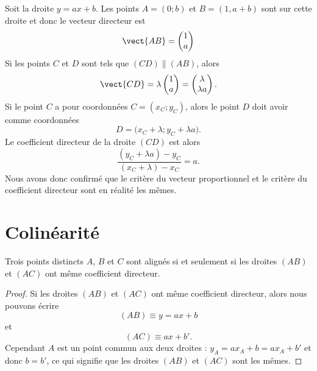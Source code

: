 Soit la droite \( y=ax+b\). Les points \( A=(0;b)\) et \( B=(1,a+b)\) sont sur cette droite et donc le vecteur directeur est
\begin{equation}
    \vect{ AB }=\begin{pmatrix}
        1    \\ 
        a    
    \end{pmatrix}
\end{equation}
Si les points \( C\) et \( D\) sont tels que \( (CD)\parallel (AB)\), alors
\begin{equation}
    \vect{ CD }=\lambda\begin{pmatrix}
        1    \\ 
        a    
    \end{pmatrix}=\begin{pmatrix}
        \lambda    \\ 
            \lambda a
    \end{pmatrix}.
\end{equation}
Si le point \( C\) a pour coordonnées \( C=(x_C;y_C)\), alors le point \( D\) doit avoir comme coordonnées
\begin{equation}
    D=\big( x_C+\lambda;y_C+\lambda a \big).
\end{equation}
Le coefficient directeur de la droite \( (CD)\) est alors
\begin{equation}
    \frac{ (y_C+\lambda a)-y_C }{ (x_C+\lambda)-x_C }=a.
\end{equation}
Nous avons donc confirmé que le critère du vecteur proportionnel et le critère du coefficient directeur sont en réalité les mêmes.

\section{Colinéarité}

\begin{theorem}
    Trois points distincts \( A\), \( B\) et \( C\) sont alignés si et seulement si les droites \( (AB)\) et \( (AC)\) ont même coefficient directeur.
\end{theorem}

\begin{proof}
    Si les droites \( (AB)\) et \( (AC)\) ont même coefficient directeur, alors nous pouvons écrire
    \begin{equation}
        (AB)\equiv y=ax+b
    \end{equation}
    et
    \begin{equation}
        (AC)\equiv ax+b'.
    \end{equation}
    Cependant \( A\) est un point commun aux deux droites : \( y_A=ax_A+b=ax_A+b'\) et donc \( b=b'\), ce qui signifie que les droites \( (AB)\) et \( (AC)\) sont les mêmes.
\end{proof}

